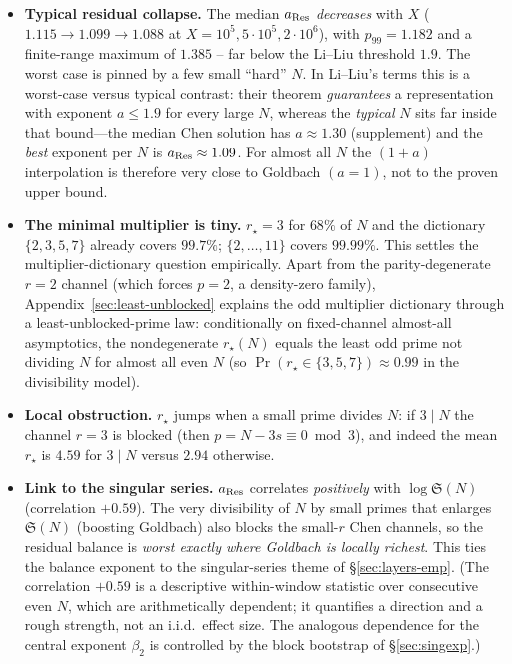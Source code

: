\documentclass[]{interact}%
\newcommand{\sing}{\mathfrak S}
\begin{document}
\begin{itemize}[leftmargin=2em]
\item \textbf{Typical residual collapse.} The median $a_{\rm Res}$ \emph{decreases}
with $X$ ($1.115\to1.099\to1.088$ at $X=10^5,5\cdot10^5,2\cdot10^6$), with
$p_{99}=1.182$ and a finite-range maximum of $1.385$ -- far below the Li--Liu
threshold $1.9$. The worst case is pinned by a few small ``hard'' $N$.
In Li--Liu's terms this is a worst-case versus typical contrast: their theorem
\emph{guarantees} a representation with exponent $a\le1.9$ for every large $N$, whereas the
\emph{typical} $N$ sits far inside that bound---the median Chen solution has $a\approx1.30$
(supplement) and the \emph{best} exponent per $N$ is $a_{\rm Res}\approx1.09$. For almost all
$N$ the $(1+a)$ interpolation is therefore very close to Goldbach $(a=1)$, not to the proven
upper bound.
\item \textbf{The minimal multiplier is tiny.} $r_\star=3$ for $68\%$ of $N$ and the
dictionary $\{2,3,5,7\}$ already covers $99.7\%$; $\{2,\dots,11\}$ covers
$99.99\%$. This settles the multiplier-dictionary question empirically.
Apart from the parity-degenerate $r=2$ channel (which forces $p=2$, a density-zero
family), Appendix~\ref{sec:least-unblocked} explains the odd multiplier dictionary
through a least-unblocked-prime law: conditionally on fixed-channel almost-all
asymptotics, the nondegenerate $r_\star(N)$ equals the least odd prime not dividing $N$
for almost all even $N$ (so $\Pr(r_\star\in\{3,5,7\})\approx0.99$ in the divisibility
model).
\item \textbf{Local obstruction.} $r_\star$ jumps when a small prime divides $N$: if
$3\mid N$ the channel $r=3$ is blocked (then $p=N-3s\equiv0\bmod3$), and indeed the
mean $r_\star$ is $4.59$ for $3\mid N$ versus $2.94$ otherwise.
\item \textbf{Link to the singular series.} $a_{\rm Res}$ correlates
\emph{positively} with $\log\sing(N)$ (correlation $+0.59$). The very divisibility
of $N$ by small primes that enlarges $\sing(N)$ (boosting Goldbach) also blocks the
small-$r$ Chen channels, so the residual balance is \emph{worst exactly where
Goldbach is locally richest}. This ties the balance exponent to the singular-series
theme of \S\ref{sec:layers-emp}. (The correlation $+0.59$ is a descriptive within-window
statistic over consecutive even $N$, which are arithmetically dependent; it quantifies a
direction and a rough strength, not an i.i.d.\ effect size. The analogous dependence for the
central exponent $\beta_2$ is controlled by the block bootstrap of \S\ref{sec:singexp}.)
\end{itemize}
\end{document}
